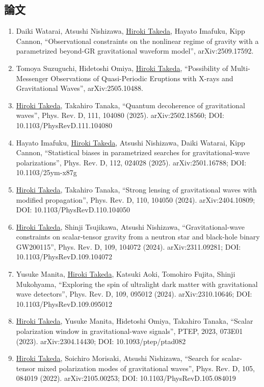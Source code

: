 \documentclass[uplatex, 11pt]{jsarticle}
\begin{document}
\subsection*{論文}
\begin{enumerate}
\item Daiki Watarai, Atsushi Nishizawa, \uline{Hiroki Takeda}, Hayato Imafuku, Kipp Cannon, “Observational constraints on the nonlinear regime of gravity with a parametrized beyond-GR gravitational waveform model”, arXiv:2509.17592.
\item Tomoya Suzuguchi, Hidetoshi Omiya, \uline{Hiroki Takeda}, “Possibility of Multi-Messenger Observations of Quasi-Periodic Eruptions with X-rays and Gravitational Waves”, arXiv:2505.10488.
\item \uline{Hiroki Takeda}, Takahiro Tanaka, “Quantum decoherence of gravitational waves”, Phys. Rev. D, 111, 104080 (2025). arXiv:2502.18560; DOI: 10.1103/PhysRevD.111.104080
\item Hayato Imafuku, \uline{Hiroki Takeda}, Atsushi Nishizawa, Daiki Watarai, Kipp Cannon, “Statistical biases in parametrized searches for gravitational-wave polarizations”, Phys. Rev. D, 112, 024028 (2025). arXiv:2501.16788; DOI: 10.1103/25ym-x87g
\item \uline{Hiroki Takeda}, Takahiro Tanaka, “Strong lensing of gravitational waves with modified propagation”, Phys. Rev. D, 110, 104050 (2024). arXiv:2404.10809; DOI: 10.1103/PhysRevD.110.104050
\item \uline{Hiroki Takeda}, Shinji Tsujikawa, Atsushi Nishizawa, “Gravitational-wave constraints on scalar-tensor gravity from a neutron star and black-hole binary GW200115”, Phys. Rev. D, 109, 104072 (2024). arXiv:2311.09281; DOI: 10.1103/PhysRevD.109.104072
\item Yusuke Manita, \uline{Hiroki Takeda}, Katsuki Aoki, Tomohiro Fujita, Shinji Mukohyama, “Exploring the spin of ultralight dark matter with gravitational wave detectors”, Phys. Rev. D, 109, 095012 (2024). arXiv:2310.10646; DOI: 10.1103/PhysRevD.109.095012
\item \uline{Hiroki Takeda}, Yusuke Manita, Hidetoshi Omiya, Takahiro Tanaka, “Scalar polarization window in gravitational-wave signals”, PTEP, 2023, 073E01 (2023). arXiv:2304.14430; DOI: 10.1093/ptep/ptad082
\item \uline{Hiroki Takeda}, Soichiro Morisaki, Atsushi Nishizawa, “Search for scalar-tensor mixed polarization modes of gravitational waves”, Phys. Rev. D, 105, 084019 (2022). arXiv:2105.00253; DOI: 10.1103/PhysRevD.105.084019

\end{enumerate}
\end{document}
